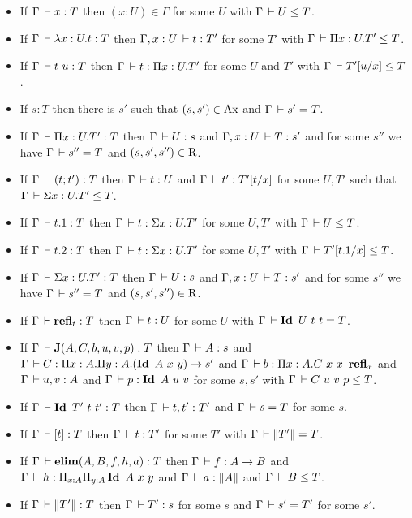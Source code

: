 \documentclass[a4paper,english]{lipics-utf8x}
\begin{document}
  \begin{lemma}[Inversion]
    \label{lem:inversion}
    \leavevmode
    \begin{itemize}
      \item If $\Gamma \,\vdash x : T$ then $(x:U) \in \Gamma$ for some
      $U$ with $\Gamma \,\vdash U \le T$.
      \item If $\Gamma \,\vdash \lambda x:U.t : T$ then $\Gamma, x:U \,\vdash t : T'$
      for some $T'$ with $\Gamma \,\vdash \Pi x:U.T' \le T$.
      \item If $\Gamma \,\vdash t\ u : T$ then $\Gamma \,\vdash t : \Pi x:U.T'$
      for some $U$ and $T'$ with $\Gamma \,\vdash T'[u/x] \le T$.
      \item If $s : T$ then there is $s'$ such that $(s,s') \in \operatorname{Ax}$
      and $\Gamma \,\vdash s' = T$.
      \item If $\Gamma \,\vdash \Pi x:U.T' : T$ then $\Gamma \,\vdash U : s$
      and $\Gamma, x:U \,\vdash T : s'$ and for some $s''$ we have
      $\Gamma \,\vdash s'' = T$ and $(s,s',s'') \in \operatorname{R}$.
      \item If $\Gamma \,\vdash (t ; t') : T$ then $\Gamma \,\vdash t : U$ and
      $\Gamma \,\vdash t' : T'[t/x]$ for some $U,T'$ such that
      $\Gamma \,\vdash \Sigma x:U.T' \le T$.
      \item If $\Gamma \,\vdash t.1 : T$ then $\Gamma \,\vdash t : \Sigma x:U.T'$
      for some $U,T'$ with $\Gamma \,\vdash U \le T$.
      \item If $\Gamma \,\vdash t.2 : T$ then $\Gamma \,\vdash t : \Sigma x:U.T'$
      for some $U,T'$ with $\Gamma \,\vdash T'[t.1/x] \le T$.
      \item If $\Gamma \,\vdash \Sigma x:U.T' : T$ then $\Gamma \,\vdash U : s$
      and $\Gamma, x:U \,\vdash T : s'$ and for some $s''$ we have
      $\Gamma \,\vdash s'' = T$ and $(s,s',s'') \in \operatorname{R}$.
      \item If $\Gamma \,\vdash \operatorname{\mathbf{refl}}_t : T$ then $\Gamma \,\vdash t : U$
      for some $U$ with $\Gamma \,\vdash \operatorname{\mathbf{Id}~} U\ t\ t = T$.
      \item If $\Gamma \,\vdash \operatorname{\mathbf{J}}(A,C,b,u,v,p) : T$ then $\Gamma \,\vdash A : s$
      and $\Gamma \der C : \Pi x:A. \Pi y:A. (\Id A\ x\ y) \to s'$ and
      $\Gamma \,\vdash b : \Pi x:A. C\ x\ x\ \operatorname{\mathbf{refl}}_x$ and $\Gamma \,\vdash u, v : A$
      and $\Gamma \der p : \Id A\ u\ v$ for some $s,s'$ with
      $\Gamma \,\vdash C\ u\ v\ p \le T$.
      \item If $\Gamma \,\vdash \operatorname{\mathbf{Id}~} T'\ t\ t' : T$ then $\Gamma \,\vdash t,t' : T'$
      and $\Gamma \,\vdash s = T$ for some $s$.
      \item If $\Gamma \,\vdash [t] : T$ then $\Gamma \,\vdash t : T'$ for some
      $T'$ with $\Gamma \,\vdash \|T'\| = T$.
      \item If $\Gamma \,\vdash \operatorname{\mathbf{elim}}(A,B,f,h,a) : T$ then
      $\Gamma \,\vdash f : A \to B$ and
      $\Gamma \,\vdash h : \Pi_{x:A} \Pi_{y:A} \operatorname{\mathbf{Id}~} A\ x\ y$
      and $\Gamma \,\vdash a : \|A\|$ and $\Gamma \,\vdash B \le T$.
      \item If $\Gamma \,\vdash \|T'\| : T$ then $\Gamma \,\vdash T' : s$ for
      some $s$ and $\Gamma \,\vdash s' = T'$ for some $s'$.
    \end{itemize}
  \end{lemma}
\end{document}
